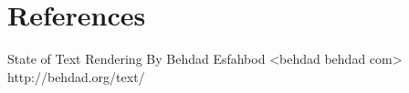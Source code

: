 \chapter{References}

State of Text Rendering By Behdad Esfahbod <behdad behdad com>   http://behdad.org/text/ 

